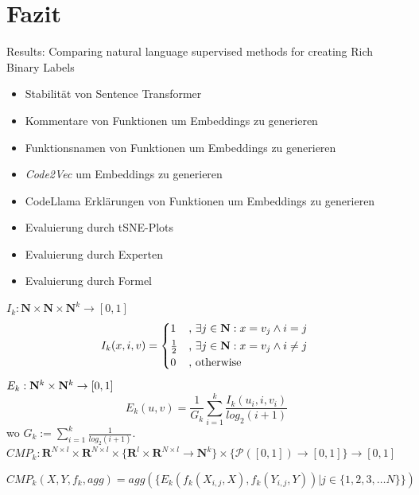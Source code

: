 \documentclass[12pt,letterpaper,ngerman]{article}
\begin{document}
\section{Fazit}

Results: Comparing natural language supervised methods for creating Rich Binary Labels
\begin{itemize}
  \item Stabilität von Sentence Transformer
  \item Kommentare von Funktionen um Embeddings zu generieren
  \item Funktionsnamen von Funktionen um Embeddings zu generieren
  \item \textit{Code2Vec} um Embeddings zu generieren
  \item CodeLlama Erklärungen von Funktionen um Embeddings zu generieren
  \item Evaluierung durch tSNE-Plots
  \item Evaluierung durch Experten
  \item Evaluierung durch Formel
\end{itemize}
$ I_{k}: \mathbf{N} \times \mathbf{N} \times \mathbf{N}^{k} \to [0,1]$
\[ I_{k}(x,i,v) = \begin{cases*} 
1 & , $\exists j \in \mathbf{N}: x = v_j \land i = j$   \\
      \frac{1}{2} & , $\exists j \in \mathbf{N}: x = v_j \land i \neq j$\\
      0   & , \text{otherwise}
                \end{cases*} \]
$E_k: \mathbf{N}^k \times \mathbf{N}^k \to [0,1]$
\[ E_k(u,v) = \frac{1}{G_k} \sum^{k}_{i=1} \frac{I_k(u_i,i,v_i)}{log_2(i+1)}\]
wo $G_k := \sum_{i=1}^{k} \frac{1}{log_2(i+1)}$.\\
$CMP_k: \mathbf{R}^{N\times l} \times \mathbf{R}^{N\times l} \times 
\{ \mathbf{R}^l \times \mathbf{R}^{N\times l} \to \mathbf{N}^k \} 
\times \{ \mathcal{P}([0,1]) \to [0,1] \} \to [0,1]$

\[ CMP_k(X,Y,f_k,agg) = agg(\{E_k(f_k(X_{i,j},X),f_k(Y_{i,j},Y)) | j \in \{1,2,3, \dots N\}\})\]

\pagebreak

\pagestyle{fancy}



\nocite{*} %
\end{document}
